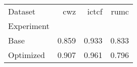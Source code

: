 \begin{tabular}{lrrr}
\toprule
Dataset &   cwz &  ictcf &  rumc \\
Experiment &       &        &       \\
\midrule
Base       & 0.859 &  0.933 & 0.833 \\
Optimized  & 0.907 &  0.961 & 0.796 \\
\bottomrule
\end{tabular}
